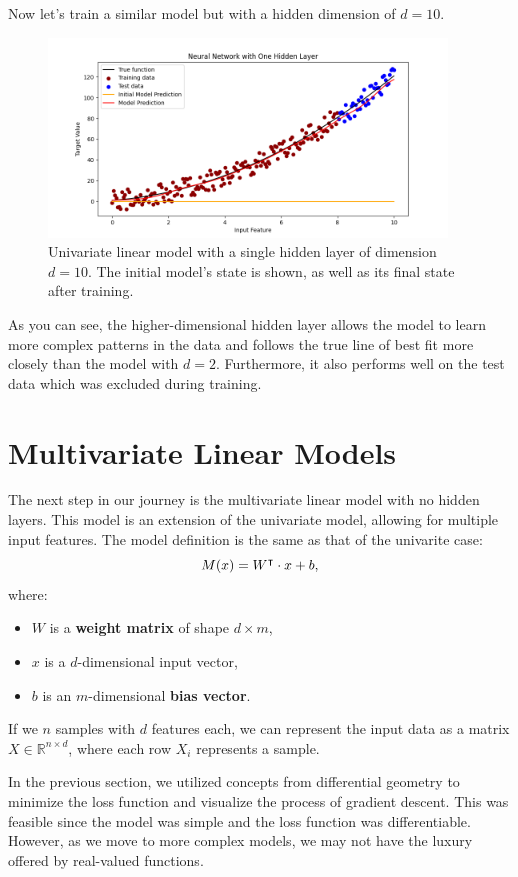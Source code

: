 Now let's train a similar model but with a hidden dimension of $d=10$.



\begin{figure}[H]
\centering
\includegraphics[width=300pt]{Regression/code/neural-network2.png}
\caption{Univariate linear model with a single hidden layer of dimension $d=10$. The initial model's state is shown, as well as its final state after training.}
\label{fig:linear11}
\end{figure}

As you can see, the higher-dimensional hidden layer allows the model to learn more complex patterns in the data and follows the true line of best fit more closely than the model with $d=2$. Furthermore, it also performs well on the test data which was excluded during training. 

\section{Multivariate Linear Models}
The next step in our journey is the multivariate linear model with no hidden layers. This model is an extension of the univariate model, allowing for multiple input features. The model definition is the same as that of the univarite case:
$$M(x) = W^\intercal\cdot x + b,$$
where:
\begin{itemize}
    \item $W$ is a \textbf{weight matrix} of shape $d \times m$,
    \item $x$ is a $d$-dimensional input vector,
    \item $b$ is an $m$-dimensional \textbf{bias vector}.
\end{itemize}
If we $n$ samples with $d$ features each, we can represent the input data as a matrix $X\in\mathbb{R}^{n\times d}$, where each row $X_i$ represents a sample. 

In the previous section, we utilized concepts from differential geometry to minimize the loss function and visualize the process of gradient descent. This was feasible since the model was simple and the loss function was differentiable. However, as we move to more complex models, we may not have the luxury offered by real-valued functions. 

